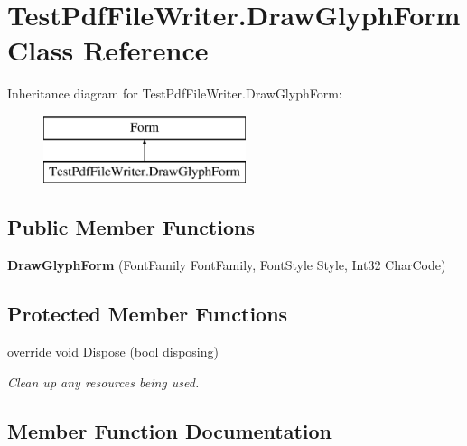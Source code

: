 \hypertarget{class_test_pdf_file_writer_1_1_draw_glyph_form}{}\section{Test\+Pdf\+File\+Writer.\+Draw\+Glyph\+Form Class Reference}
\label{class_test_pdf_file_writer_1_1_draw_glyph_form}
Inheritance diagram for Test\+Pdf\+File\+Writer.\+Draw\+Glyph\+Form\+:\begin{figure}[H]
\begin{center}
\leavevmode
\includegraphics[height=2.000000cm]{class_test_pdf_file_writer_1_1_draw_glyph_form}
\end{center}
\end{figure}
\subsection*{Public Member Functions}
\begin{DoxyCompactItemize}
\item 
{\bfseries Draw\+Glyph\+Form} (Font\+Family Font\+Family, Font\+Style Style, Int32 Char\+Code)\hypertarget{class_test_pdf_file_writer_1_1_draw_glyph_form_a7061a7b02e53243e2d6d69a4d761f54c}{}\label{class_test_pdf_file_writer_1_1_draw_glyph_form_a7061a7b02e53243e2d6d69a4d761f54c}

\end{DoxyCompactItemize}
\subsection*{Protected Member Functions}
\begin{DoxyCompactItemize}
\item 
override void \hyperlink{class_test_pdf_file_writer_1_1_draw_glyph_form_ad99bd5ce5412dcd4a98051384ed47aad}{Dispose} (bool disposing)
\begin{DoxyCompactList}\small\item\em Clean up any resources being used. \end{DoxyCompactList}\end{DoxyCompactItemize}


\subsection{Member Function Documentation}
